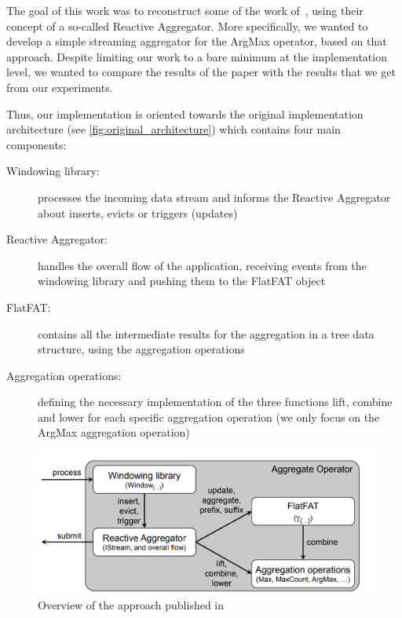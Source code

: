 The goal of this work was to reconstruct some of the work of~\cite{GeneralIncremental15}, using their concept of a so-called Reactive Aggregator. More specifically, we wanted to develop a simple streaming aggregator for the ArgMax operator, based on that approach. Despite limiting our work to a bare minimum at the implementation level, we wanted to compare the results of the paper with the results that we get from our experiments.

Thus, our implementation is oriented towards the original implementation architecture (see \autoref{fig:original_architecture}) which contains four main components:
\begin{description}
	\item[Windowing library:] processes the incoming data stream and informs the Reactive Aggregator about inserts, evicts or triggers (updates)
	\item[Reactive Aggregator:] handles the overall flow of the application, receiving events from the windowing library and pushing them to the FlatFAT object
	\item[FlatFAT:] contains all the intermediate results for the aggregation in a tree data structure, using the aggregation operations
	\item[Aggregation operations:] defining the necessary implementation of the three functions lift, combine and lower for each specific aggregation operation (we only focus on the ArgMax aggregation operation)
\end{description}

\begin{figure}[H]
	\centering
	\includegraphics[width=\linewidth]{figures/original_architecture}
	\caption{Overview of the approach published in~\cite{GeneralIncremental15}}
	\label{fig:original_architecture}
\end{figure}